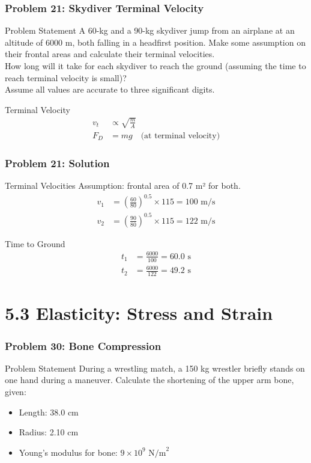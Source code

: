 \documentclass{beamer}
\begin{document}
\begin{frame}
\frametitle{Problem 21: Skydiver Terminal Velocity}
\begin{block}{Problem Statement}
A 60-kg and a 90-kg skydiver jump from an airplane at an altitude of 6000 m, both falling in a headfirst position.
Make some assumption on their frontal areas and calculate their terminal velocities. \\
How long will it take for each skydiver to reach the ground (assuming the time to reach terminal velocity is small)? \\
Assume all values are accurate to three significant digits.
\end{block}

\begin{block}{Terminal Velocity}
\begin{align*}
v_t &\propto \sqrt{\frac{m}{A}} \\
F_D &= mg \quad \text{(at terminal velocity)}
\end{align*}
\end{block}
\end{frame}

\begin{frame}
\frametitle{Problem 21: Solution}
\begin{block}{Terminal Velocities}
Assumption: frontal area of 0.7 m² for both.
\begin{align*}
v_1 &= \left(\frac{60}{80}\right)^{0.5} \times 115 = 100 \text{ m/s} \\
v_2 &= \left(\frac{90}{80}\right)^{0.5} \times 115 = 122 \text{ m/s}
\end{align*}
\end{block}

\begin{block}{Time to Ground}
\begin{align*}
t_1 &= \frac{6000}{100} = 60.0 \text{ s} \\
t_2 &= \frac{6000}{122} = 49.2 \text{ s}
\end{align*}
\end{block}
\end{frame}

\section{5.3 Elasticity: Stress and Strain}

\begin{frame}
\frametitle{Problem 30: Bone Compression}
\begin{block}{Problem Statement}
During a wrestling match, a 150 kg wrestler briefly stands on one hand during a maneuver. Calculate the shortening of the upper arm bone, given:
\begin{itemize}
    \item Length: 38.0 cm
    \item Radius: 2.10 cm
    \item Young's modulus for bone: $9 \times 10^9 \text{ N/m}^2$
\end{itemize}
\end{block}
\end{frame}
\end{document}
